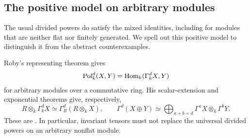 \subsection{The positive model on arbitrary modules}\label{sec:positive-laws}
The usual divided powers do satisfy the mixed identities, including for
modules that are neither flat nor finitely generated. We spell out this
positive model to distinguish it from the abstract counterexamples.

Roby's representing theorem gives
\[
 \operatorname{Pol}^d_k(X,Y)=\operatorname{Hom}_k(\Gamma^d_kX,Y)
\]
for arbitrary modules over a commutative ring. His scalar-extension and
exponential theorems give, respectively,
\[
 R\otimes_k\Gamma_k^dX\simeq\Gamma_R^d(R\otimes_kX),\qquad
 \Gamma^d(X\oplus Y)\simeq
 \bigoplus_{a+b=d}\Gamma^aX\otimes_k\Gamma^bY.
\]
These are \cite[Theorem~IV.1, pp.~266--267; Theorems~III.3--III.4,
pp.~262--263]{Roby}. In particular, invariant tensors must not replace
the universal divided powers on an arbitrary nonflat module.

